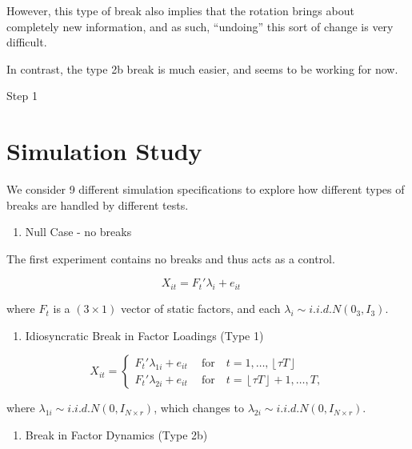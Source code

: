 \documentclass[
]{article}
\providecommand{\tightlist}{%
  \setlength{\itemsep}{0pt}\setlength{\parskip}{0pt}}
\begin{document}
However, this type of break also implies that the rotation brings about
completely new information, and as such, ``undoing'' this sort of change
is very difficult.

In contrast, the type 2b break is much easier, and seems to be working
for now.

Step 1


\hypertarget{simulation-study}{%
\section{Simulation Study}\label{simulation-study}}

We consider 9 different simulation specifications to explore how
different types of breaks are handled by different tests.

\begin{enumerate}
\def\labelenumi{\arabic{enumi}.}
\tightlist
\item
  Null Case - no breaks
\end{enumerate}

The first experiment contains no breaks and thus acts as a control.

\[
X_{it} = F_{t}' \lambda_{i} + e_{it}\ \quad 
\]

where \(F_t\) is a \((3 \times 1)\) vector of static factors, and each
\(\lambda_i \sim i.i.d. N(0_3, I_3)\).

\begin{enumerate}
\def\labelenumi{\arabic{enumi}.}
\setcounter{enumi}{1}
\tightlist
\item
  Idiosyncratic Break in Factor Loadings (Type 1)
\end{enumerate}

\[
X_{it} = \begin{cases}
F_{t}' \lambda_{1i} + e_{it}\ \quad \text{for} \quad t = 1, \dots, \left \lfloor \tau T \right \rfloor  \\
F_{t}' \lambda_{2i} + e_{it}\ \quad \text{for} \quad t = \left \lfloor \tau T \right \rfloor  + 1, \dots, T,
\end{cases}
\]

where \(\lambda_{1i} \sim i.i.d. N(0, I_{N \times r})\), which changes
to \(\lambda_{2i} \sim i.i.d. N(0, I_{N \times r})\).

\begin{enumerate}
\def\labelenumi{\arabic{enumi}.}
\setcounter{enumi}{2}
\tightlist
\item
  Break in Factor Dynamics (Type 2b)
\end{enumerate}
\end{document}
